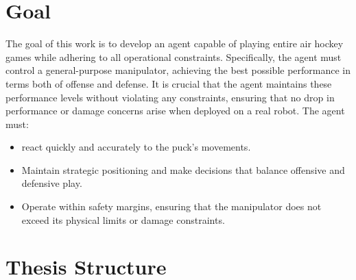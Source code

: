 \section*{Goal}
The goal of this work is to develop an agent capable of playing entire air hockey games while adhering to all operational constraints. Specifically, the agent must control a general-purpose manipulator, achieving the best possible performance
in terms both of offense and defense.
It is crucial that the agent maintains these performance levels without violating any constraints, 
ensuring that no drop in performance or damage concerns arise when deployed on a real robot. The agent must:
\begin{itemize}
    \item react quickly and accurately to the puck's movements.
    \item Maintain strategic positioning and make decisions that balance offensive and defensive play.
    \item Operate within safety margins, ensuring that the manipulator does not exceed its physical limits or damage constraints.
\end{itemize}

\section*{Thesis Structure}

